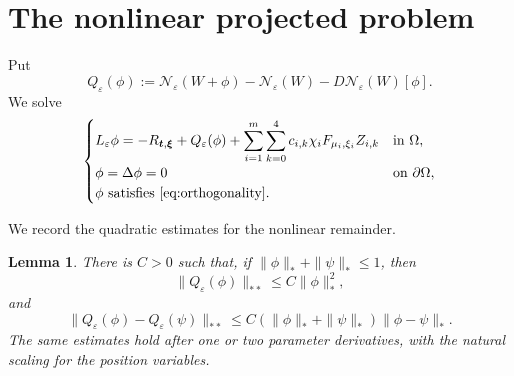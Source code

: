\documentclass[11pt]{article}
\newtheorem{lemma}[theorem]{Lemma}
\numberwithin{equation}{section}
\begin{document}
\section{The nonlinear projected problem}

Put
\begin{equation*}
Q_\varepsilon(\phi)
:=\mathcal N_\varepsilon(W+\phi)
-\mathcal N_\varepsilon(W)-D\mathcal N_\varepsilon(W)[\phi].
\end{equation*}
We solve
\begin{equation}\label{eq:projected-nonlinear-problem}
\begin{cases}
\displaystyle
L_\varepsilon\phi
=-R_{\boldsymbol t,\boldsymbol\xi}+Q_\varepsilon(\phi)
+\displaystyle\sum_{i=1}^{m}\sum_{k=0}^{4}
 c_{i,k}\chi_iF_{\mu_i,\xi_i}Z_{i,k}
&\text{in }\Omega,\\
\phi=\Delta\phi=0&\text{on }\partial\Omega,\\
\phi\text{ satisfies }\eqref{eq:orthogonality}.&
\end{cases}
\end{equation}

We record the quadratic estimates for the nonlinear remainder.

\begin{lemma}\label{lem:nonlinear-estimates}
There is $C>0$ such that, if $\|\phi\|_*+\|\psi\|_*\leq1$, then
\begin{equation}\label{eq:quadratic-estimate}
\|Q_\varepsilon(\phi)\|_{**}
\leq C\|\phi\|_*^2,
\end{equation}
and
\begin{equation}\label{eq:Lipschitz-estimate}
\|Q_\varepsilon(\phi)-Q_\varepsilon(\psi)\|_{**}
\leq C(\|\phi\|_*+\|\psi\|_*)\|\phi-\psi\|_*.
\end{equation}
The same estimates hold after one or two parameter derivatives, with the natural scaling for the position variables.
\end{lemma}
\end{document}
